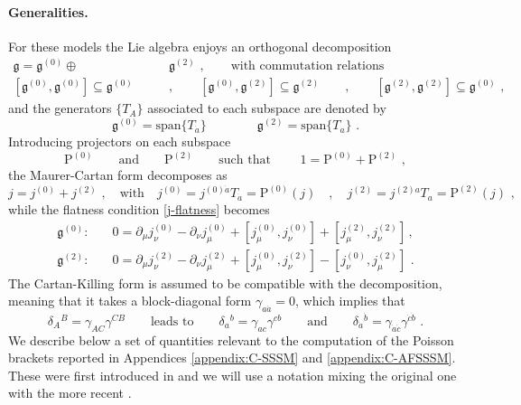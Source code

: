 \documentclass[12pt]{article}
\numberwithin{equation}{section}
\begin{document}
\paragraph{Generalities.} 
For these models the Lie algebra enjoys an orthogonal decomposition
\begin{equation}\label{SSSM-Lie-algebra-commutators}
\begin{aligned}
\mathfrak{g}=\mathfrak{g}^{(0)}\oplus& \mathfrak{g}^{(2)} \,\, , 
\qquad   \text{with commutation relations} 
\\
[\mathfrak{g}^{(0)},\mathfrak{g}^{(0)}] \subseteq \mathfrak{g}^{(0)} \qquad &, \qquad [\mathfrak{g}^{(0)},\mathfrak{g}^{(2)}] \subseteq \mathfrak{g}^{(2)}
\qquad , \qquad [\mathfrak{g}^{(2)},\mathfrak{g}^{(2)}] \subseteq \mathfrak{g}^{(0)} \,\, ,
\end{aligned}
\end{equation}
and the generators $\{T_{A}\}$ associated to each subspace are denoted by
\begin{equation}
\mathfrak{g}^{(0)} =\text{span\{}T_{\dot{a}}\}
\qquad \qquad
\mathfrak{g}^{(2)} =\text{span\{}T_{a}\} \,\, .
\end{equation}
Introducing projectors on each subspace
\begin{equation}\label{projectors}
\mathrm{P}^{(0)}
\qquad \text{and} \qquad \mathrm{P}^{(2)} \qquad \text{such that }\qquad  1=\mathrm{P}^{(0)}+\mathrm{P}^{(2)} \,\, ,  
\end{equation}
the Maurer-Cartan form decomposes as
\begin{equation}\label{j-projections}
j= j^{(0)}+j^{(2)} \,\, , \quad \text{with} \quad  j^{(0)}=j^{(0)\dot{a}}T_{\dot{a}}=\mathrm{P}^{(0)}(j) \quad , \quad j^{(2)}=j^{(2)a}T_{a}=\mathrm{P}^{(2)}(j) \,\, ,
\end{equation}
while the flatness condition \eqref{j-flatness} becomes
\begin{equation} \label{def-sssm-MC-eq-decomposition}
\begin{aligned}
\mathfrak{g}^{(0)}:& \quad 0=  \partial_{\mu}j^{(0)}_{\nu}-\partial_{\nu}j^{(0)}_{\mu}+[j^{(0)}_{\mu},j^{(0)}_{\nu}]+[j^{(2)}_{\mu},j^{(2)}_{\nu}] \, ,
\\
\mathfrak{g}^{(2)}:& \quad 0=\partial_{\mu}j^{(2)}_{\nu}-\partial_{\nu}j^{(2)}_{\mu}+[j^{(0)}_{\mu},j^{(2)}_{\nu}]-[j^{(0)}_{\nu},j^{(2)}_{\mu}] \,\, .
\end{aligned}
\end{equation}
The Cartan-Killing form is assumed to be compatible with the decomposition, meaning that it takes a block-diagonal form $\gamma_{a\dot{a}}=0$, which implies that
\begin{equation}
\delta_{A}{}^{B}=\gamma_{AC}\gamma^{CB} \qquad \text{leads to} \qquad
\delta_{a}{}^{b}=\gamma_{ac}\gamma^{cb}
\qquad \text{and} \qquad
\delta_{\dot{a}}{}^{\dot{b}}=\gamma_{\dot{a}\dot{c}}\gamma^{\dot{c}\dot{b}} \,\, .
\end{equation}
We describe below a set of quantities relevant to the computation of the Poisson brackets reported in Appendices \ref{appendix:C-SSSM} and \ref{appendix:C-AFSSSM}. These were first introduced in \cite{Forger:1991cm} and we will use a notation mixing the original one with the more recent \cite{Klose:2016qfv}.
\end{document}
